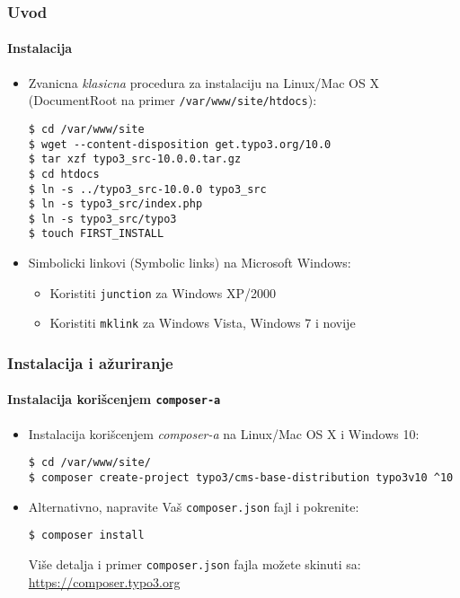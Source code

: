 
\begin{frame}[fragile]
	\frametitle{Uvod}
	\framesubtitle{Instalacija}

	\begin{itemize}
		\item Zvanicna \textit{klasicna} procedura za instalaciju na Linux/Mac OS X\newline
			(DocumentRoot na primer \texttt{/var/www/site/htdocs}):
		\begin{lstlisting}
$ cd /var/www/site
$ wget --content-disposition get.typo3.org/10.0
$ tar xzf typo3_src-10.0.0.tar.gz
$ cd htdocs
$ ln -s ../typo3_src-10.0.0 typo3_src
$ ln -s typo3_src/index.php
$ ln -s typo3_src/typo3
$ touch FIRST_INSTALL
		\end{lstlisting}

		\item Simbolicki linkovi (Symbolic links) na Microsoft Windows:

			\begin{itemize}
				\item Koristiti \texttt{junction} za Windows XP/2000
				\item Koristiti \texttt{mklink} za Windows Vista, Windows 7 i novije
			\end{itemize}

	\end{itemize}
\end{frame}


\begin{frame}[fragile]
	\frametitle{Instalacija i ažuriranje}
	\framesubtitle{Instalacija korišcenjem \texttt{composer-a}}

	\begin{itemize}
		\item Instalacija korišcenjem \textit{composer-a} na Linux/Mac OS X i Windows 10:

			\begin{lstlisting}
$ cd /var/www/site/
$ composer create-project typo3/cms-base-distribution typo3v10 ^10
			\end{lstlisting}

		\item Alternativno, napravite Vaš \texttt{composer.json} fajl i pokrenite:

			\begin{lstlisting}
$ composer install
			\end{lstlisting}

			Više detalja i primer \texttt{composer.json} fajla možete skinuti sa:\newline
			\smaller
				\href{https://composer.typo3.org}{https://composer.typo3.org}
			\normalsize

	\end{itemize}
\end{frame}

